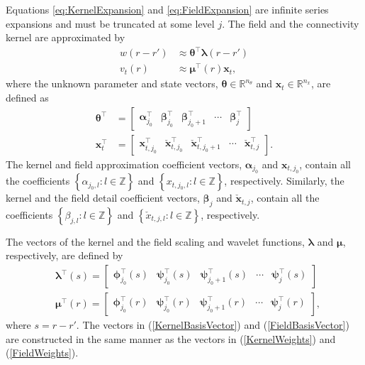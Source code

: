 \documentclass[journal]{IEEEtran}
\begin{document}
Equations \eqref{eq:KernelExpansion} and \eqref{eq:FieldExpansion} are infinite series expansions and must be truncated at some level $j$. The field and the connectivity kernel are approximated by
\begin{align}
	w\left(r-r'\right) &\approx \boldsymbol\theta^\top\boldsymbol\lambda\left(r-r'\right) 
	\label{eq:KernelFiniteExpansion} \\
	v_t\left(r\right) &\approx \boldsymbol\mu^\top\left(r\right)\mathbf{x}_t,
	\label{eq:FieldFiniteExpansion}
\end{align}
where the unknown parameter and state vectors, $\boldsymbol\theta \in \mathbb{R}^{n_{\theta}}$ and $\mathbf{x}_t \in \mathbb{R}^{n_x}$, are defined as 
\begin{align}
\boldsymbol\theta^\top &=[\begin{array}{ccccc} \boldsymbol\alpha_{j_0}^\top & \boldsymbol\beta_{j_0}^\top & \boldsymbol\beta_{j_0+1}^\top & \cdots & \boldsymbol\beta_{j}^\top \end{array}] 
\label{KernelWeights} \\
\mathbf{x}_{t}^\top &=[\begin{array}{ccccc}\mathbf{x}_{t,j_{0}}^\top &  \check{\mathbf{x}}_{t,j_{0}}^\top & \check{\mathbf{x}}_{t,j_{0}+1}^\top & \cdots & \check{\mathbf{x}}_{t,j}^\top\end{array}].
\label{FieldWeights}
\end{align}
The kernel and field approximation coefficient vectors, $\boldsymbol \alpha_{j_0}$ and $\mathbf{x}_{t,j_{0}}$, contain all the coefficients $\left\lbrace\alpha_{j_0, l}:l \in \mathbb{Z} \right\rbrace $ and $\left\lbrace x_{t,j_0, l}: l \in \mathbb{Z}\right\rbrace$, respectively. Similarly, the kernel and the field detail coefficient vectors, $\boldsymbol\beta_{j}$ and $\check{\mathbf{x}}_{t,j}$, contain all the coefficients $\left\lbrace \beta_{j,l} :l \in \mathbb{Z}\right\rbrace$ and $\left\lbrace  \check x_{t,j, l}:l \in \mathbb{Z}\right\rbrace$, respectively.

The vectors of the kernel and the field scaling and wavelet functions, $\boldsymbol\lambda$ and $\boldsymbol\mu$, respectively, are defined by
\begin{align}
&\boldsymbol\lambda^\top(s)=[
	\begin{array}{ccccc}
		 \boldsymbol\phi_{j_0}^\top(s) & \boldsymbol\psi_{j_0}^\top(s) & \boldsymbol\psi_{j_0+1}^\top(s) & \cdots & \boldsymbol\psi_{j}^\top(s)
		\end{array}
		] \label{KernelBasisVector} \\
&\boldsymbol\mu^\top (r)= [
			\begin{array}{ccccc}
				\boldsymbol\phi_{j_0}^\top(r) & \boldsymbol\psi_{j_0}^\top(r) & \boldsymbol\psi_{j_0+1}^\top(r) & \cdots & \boldsymbol\psi_{j}^\top(r) 
			\end{array} 
				],
\label{FieldBasisVector}
\end{align}
where $s=r-r'$. The vectors in  (\ref{KernelBasisVector}) and (\ref{FieldBasisVector}) are constructed in the same manner as the vectors in  (\ref{KernelWeights}) and (\ref{FieldWeights}). 
 
\end{document}
